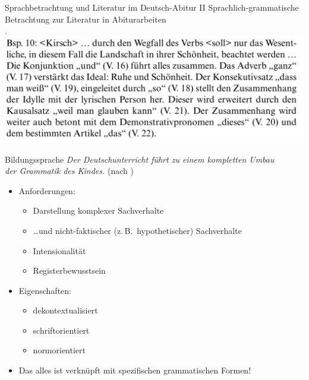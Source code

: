 \begin{frame}
  {Sprachbetrachtung und Literatur im Deutsch-Abitur II}
  Sprachlich-grammatische Betrachtung zur Literatur in Abiturarbeiten\\
  \citep{Haecker2009}.\\[\baselineskip]
  \centering
  \includegraphics[height=0.4\textheight]{graphics/haecker2}
\end{frame}

\begin{frame}
  {Bildungssprache}
  \pause
  \alert{\textit{Der Deutschunterricht führt zu einem kompletten Umbau\\
  der Grammatik des Kindes.}} (nach \citealt{Bredel2013,Eisenberg2004})\\[\baselineskip]
  \pause
  \begin{itemize}[<+->]
    \item Anforderungen:
    \begin{itemize}[<+->]
      \item Darstellung komplexer Sachverhalte
      \item \dots und nicht-faktischer (z.\,B.\ hypothetischer) Sachverhalte
      \item Intensionalität
      \item Registerbewusstsein
    \end{itemize}
        \vspace{\baselineskip}
      \item Eigenschaften:
    \begin{itemize}[<+->]
      \item dekontextualisiert
      \item schriftorientiert
      \item normorientiert
    \end{itemize}
        \vspace{\baselineskip}
      \item \alert{Das alles ist verknüpft mit spezifischen grammatischen Formen!}
  \end{itemize}
\end{frame}

